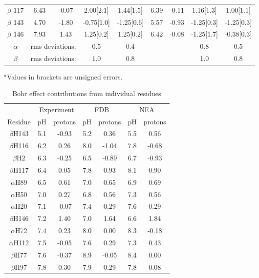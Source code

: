 \documentclass[a4paper,12pt]{article}
\begin{document}
\begin{table}
\begin{center}
\begin{tabular}{ccccccccc}
$\beta$  117 & 6.43 & -0.07 & 2.00[2.1]  &  1.44[1.5]  &  6.39 & -0.11 &  1.16[1.3]  &   1.00[1.1] \\
$\beta$  143 & 4.70 & -1.80 &-0.75[1.0]  & -1.25[0.6]  &  5.57 & -0.93 & -1.25[0.3]  &  -1.25[0.3] \\
$\beta$  146 & 7.93 &  1.43 & 1.25[0.2]  &  1.25[0.2]  &  6.42 & -0.08 &  -1.25[1.7] &  -0.38[0.3] \\ \hline 
$\alpha$   & \multicolumn{2}{r}{rms deviations:} & 0.5 & 0.4 & & & 0.8 & 0.5                       \\
$\beta$    & \multicolumn{2}{r}{rms deviations:} & 1.0 & 0.8 & & & 1.0 & 0.8                       \\  \hline 
\end{tabular}
\end{center}
{\footnotesize \noindent $^a$Values in brackets are unsigned errors.}
\end{table}

\begin{table}
\caption{Bohr effect contributions from individual residues} \label{tab:bohr}
\begin{center}
\begin{tabular}{ccccccc}  \hline
  & \multicolumn{2}{c}{Experiment}& \multicolumn{2}{c}{\hrulefill FDB \hrulefill} & \multicolumn{2}{c}{NEA} \\
Residue       &  pH   & protons &   pH  & protons & pH  & protons \\ \hline
$\beta$H143   &  5.1  &  -0.93  &   5.2 &   0.36  & 5.5 &  0.56  \\
$\beta$H116   &  6.2  &   0.26  &   8.0 &  -1.04  & 7.8 & -0.68	 \\
$\beta$H2     &  6.3  &  -0.25  &   6.5 &  -0.89  & 6.7 & -0.93  \\
$\beta$H117   &  6.4  &   0.05  &   7.8 &   0.93  & 8.1 &  0.90	 \\
$\alpha$H89   &  6.5  &   0.61  &   7.0 &   0.65  & 6.9 &  0.69  \\ \hline
$\alpha$H50   &  7.0  &   0.27  &   6.8 &   0.56  & 7.3 &  0.56  \\
$\alpha$H20   &  7.1  &  -0.07  &   7.4 &   0.29  & 7.6 &  0.29	 \\
$\beta$H146   &  7.2  &   1.40  &   7.0 &   1.64  & 6.6 &  1.84  \\
$\alpha$H72   &  7.4  &   0.23  &   8.0 &   0.00  & 8.3 & -0.18  \\
$\alpha$H112  &  7.5  &  -0.05  &   7.6 &   0.29  & 7.3 &  0.43  \\
$\beta$H77    &  7.6  &  -0.37  &   8.9 &  -0.05  & 8.4 &  0.00  \\
$\beta$H97    &  7.8  &   0.30  &   7.9 &   0.29  & 7.8 &  0.08  \\ \hline
\end{tabular}
\end{center}
{\footnotesize \noindent }
\end{table}
\end{document}
